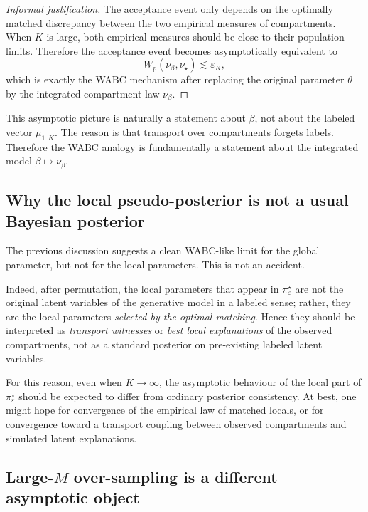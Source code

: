 \begin{proof}[Informal justification]
The acceptance event only depends on the optimally matched discrepancy between the two
empirical measures of compartments. When $K$ is large, both empirical measures should be close
to their population limits. Therefore the acceptance event becomes asymptotically equivalent to
\[
  W_p(\nu_\beta,\nu_\star) \lesssim \varepsilon_K,
\]
which is exactly the WABC mechanism after replacing the original parameter $\theta$ by the
integrated compartment law $\nu_\beta$.
\end{proof}

\begin{remark}
This asymptotic picture is naturally a statement about $\beta$, not about the labeled vector
$\mu_{1:K}$. The reason is that transport over compartments forgets labels. Therefore the WABC
analogy is fundamentally a statement about the integrated model $\beta \mapsto \nu_\beta$.
\end{remark}

\subsection{Why the local pseudo-posterior is not a usual Bayesian posterior}

The previous discussion suggests a clean WABC-like limit for the global parameter, but not for
the local parameters. This is not an accident.

Indeed, after permutation, the local parameters that appear in $\pi_\varepsilon^\star$ are not the
original latent variables of the generative model in a labeled sense; rather, they are the local
parameters \emph{selected by the optimal matching}. Hence they should be interpreted as
\emph{transport witnesses} or \emph{best local explanations} of the observed compartments, not as
a standard posterior on pre-existing labeled latent variables.

For this reason, even when $K \to \infty$, the asymptotic behaviour of the local part of
$\pi_\varepsilon^\star$ should be expected to differ from ordinary posterior consistency. At best, one
might hope for convergence of the empirical law of matched locals, or for convergence toward a
transport coupling between observed compartments and simulated latent explanations.

\subsection{Large-$M$ over-sampling is a different asymptotic object}

